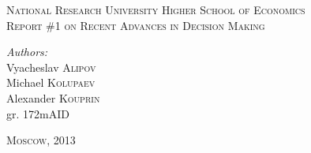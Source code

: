 \begin{titlepage}

\begin{center}
	\textsc{\Large National Research University Higher School of Economics}\\[8cm]

	\textsc{\large Report \#1 on Recent Advances in Decision Making}\\[8cm]
\end{center}

\begin{flushright}
	\emph{Authors:}\\
	Vyacheslav \textsc{Alipov}\\
	Michael \textsc{Kolupaev}\\
	Alexander \textsc{Kouprin}\\
	gr. 172mAID
\end{flushright}

\vfill

\begin{center}
	\textsc{\large Moscow, 2013}
\end{center}

\end{titlepage}

